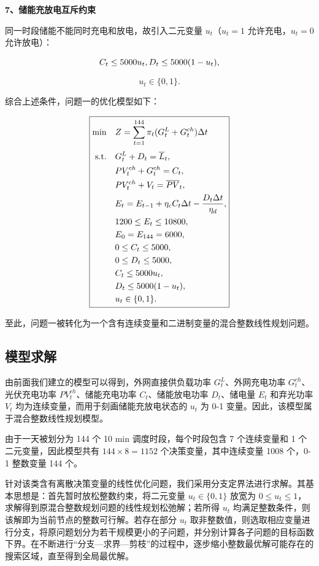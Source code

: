 \textbf{7、储能充放电互斥约束}

同一时段储能不能同时充电和放电，故引入二元变量 \(u_t\)（\(u_t=1\) 允许充电，\(u_t=0\) 允许放电）：

\[
C_t\leq5000u_t,\\
D_t\leq5000(1-u_t),
\]

\begin{equation}
u_t\in\{0,1\}.
\end{equation}

综合上述条件，问题一的优化模型如下：

\begin{equation}
\boxed{
\begin{aligned}
\min\quad
&Z=\sum_{t=1}^{144}
\pi_t(G_t^L+G_t^{ch})\Delta t \\[1mm]
{\rm s.t.}\quad
&G_t^L+D_t=\overline L_t,\\
&PV_t^{ch}+G_t^{ch}=C_t,\\
&PV_t^{ch}+V_t=\overline{PV}_t,\\
&E_t=E_{t-1}
+\eta_cC_t\Delta t
-\frac{D_t\Delta t}{\eta_d},\\
&1200\leq E_t\leq10800,\\
&E_0=E_{144}=6000,\\
&0\leq C_t\leq5000,\\
&0\leq D_t\leq5000,\\
&C_t\leq5000u_t,\\
&D_t\leq5000(1-u_t),\\
&u_t\in\{0,1\}.
\end{aligned}}
\end{equation}

至此，问题一被转化为一个含有连续变量和二进制变量的混合整数线性规划问题。

\subsection{模型求解}

由前面我们建立的模型可以得到，外网直接供负载功率 \(G_t^L\)、外网充电功率 \(G_t^{ch}\)、光伏充电功率 \(PV_t^{ch}\)、储能充电功率 \(C_t\)、储能放电功率 \(D_t\)、储电量 \(E_t\) 和弃光功率 \(V_t\) 均为连续变量，而用于刻画储能充放电状态的 \(u_t\) 为 0-1 变量。因此，该模型属于混合整数线性规划模型。

由于一天被划分为 144 个 10 min 调度时段，每个时段包含 7 个连续变量和 1 个二元变量，因此模型共有 \(144\times 8=1152\) 个决策变量，其中连续变量 1008 个，0-1 整数变量 144 个。

针对该类含有离散决策变量的线性优化问题，我们采用分支定界法进行求解。其基本思想是：首先暂时放松整数约束，将二元变量 \(u_t\in\{0,1\}\) 放宽为 \(0\leq u_t\leq1\)， 求解得到原混合整数规划问题的线性规划松弛解；若所得 \(u_t\) 均满足整数条件，则该解即为当前节点的整数可行解。若存在部分 \(u_t\) 取非整数值，则选取相应变量进行分支，将原问题划分为若干规模更小的子问题，并分别计算各子问题的目标函数下界。在不断进行“分支—求界—剪枝”的过程中，逐步缩小整数最优解可能存在的搜索区域，直至得到全局最优解。

